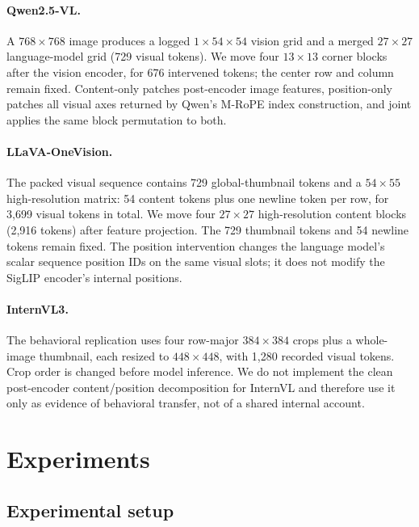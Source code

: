 \documentclass[10pt,twocolumn,letterpaper]{article}
\begin{document}
\paragraph{Qwen2.5-VL.}
A $768\!\times\!768$ image produces a logged $1\!\times\!54\!\times\!54$ vision grid and a merged $27\!\times\!27$ language-model grid (729 visual tokens).
We move four $13\!\times\!13$ corner blocks after the vision encoder, for 676 intervened tokens; the center row and column remain fixed.
Content-only patches post-encoder image features, position-only patches all visual axes returned by Qwen's M-RoPE index construction, and joint applies the same block permutation to both.

\paragraph{LLaVA-OneVision.}
The packed visual sequence contains 729 global-thumbnail tokens and a $54\!\times\!55$ high-resolution matrix: 54 content tokens plus one newline token per row, for 3,699 visual tokens in total.
We move four $27\!\times\!27$ high-resolution content blocks (2,916 tokens) after feature projection.
The 729 thumbnail tokens and 54 newline tokens remain fixed.
The position intervention changes the language model's scalar sequence position IDs on the same visual slots; it does not modify the SigLIP encoder's internal positions.

\paragraph{InternVL3.}
The behavioral replication uses four row-major $384\!\times\!384$ crops plus a whole-image thumbnail, each resized to $448\!\times\!448$, with 1,280 recorded visual tokens.
Crop order is changed before model inference.
We do not implement the clean post-encoder content/position decomposition for InternVL and therefore use it only as evidence of behavioral transfer, not of a shared internal account.

\section{Experiments}
\label{sec:experiments}

\subsection{Experimental setup}
\end{document}
